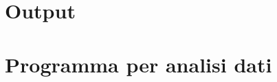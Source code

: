 \documentclass[
    rmp,
    reprint, 
    superscriptaddress, 
    altaffilletter, 
    amsmath, 
    amssymb, 
    a4paper]{revtex4-2}
\begin{document}
\onecolumngrid
\appendix

\setcounter{table}{0}
\renewcommand{\thetable}{A-\Roman{table}}
\section{Output}


\section{Programma per analisi dati}

\end{document}
